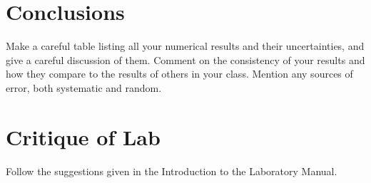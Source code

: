 \section*{Conclusions}
Make a careful table listing all your numerical results and their
uncertainties, and give a careful discussion of them.
Comment on the consistency of your results and how they compare to the
results of others in your class.  Mention any sources of error, both
systematic and random.

\section*{Critique of Lab}
     Follow the suggestions given in the Introduction to the
Laboratory Manual.

